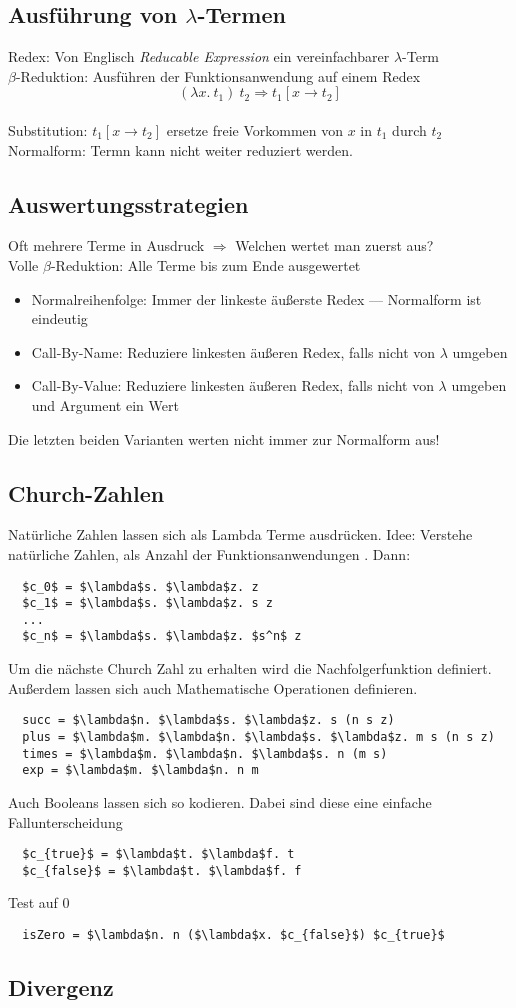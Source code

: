 \subsection{Ausführung von \(\lambda\)-Termen}
Redex: Von Englisch \textit{Reducable Expression} ein vereinfachbarer \(\lambda\)-Term\\
\(\beta\)-Reduktion: Ausführen der Funktionsanwendung auf einem Redex \[(\lambda x.\ t_1)\ t_2 \Rightarrow t_1 [x \rightarrow t_2]\]\\
Substitution: \(t_1 [x \rightarrow t_2]\) ersetze freie Vorkommen von \(x\) in \(t_1\) durch \(t_2\)\\
Normalform: Termn kann nicht weiter reduziert werden.

\subsection{Auswertungsstrategien}
Oft mehrere Terme in Ausdruck \(\Rightarrow\) Welchen wertet man zuerst aus?\\
Volle \(\beta\)-Reduktion: Alle Terme bis zum Ende ausgewertet
\begin{itemize}
  \item Normalreihenfolge: Immer der linkeste äußerste Redex --- Normalform ist eindeutig
  \item Call-By-Name: Reduziere linkesten äußeren Redex, falls nicht von \(\lambda\) umgeben
  \item Call-By-Value: Reduziere linkesten äußeren Redex, falls nicht von \(\lambda\) umgeben und Argument ein Wert
\end{itemize}
Die letzten beiden Varianten werten nicht immer zur Normalform aus!

\subsection{Church-Zahlen}
Natürliche Zahlen lassen sich als Lambda Terme ausdrücken.
Idee: Verstehe natürliche Zahlen, als Anzahl der Funktionsanwendungen . Dann:
\begin{lstlisting}
  $c_0$ = $\lambda$s. $\lambda$z. z
  $c_1$ = $\lambda$s. $\lambda$z. s z
  ...
  $c_n$ = $\lambda$s. $\lambda$z. $s^n$ z

\end{lstlisting}
Um die nächste Church Zahl zu erhalten wird die Nachfolgerfunktion  definiert.
Außerdem lassen sich auch Mathematische Operationen definieren.
\begin{lstlisting}
  succ = $\lambda$n. $\lambda$s. $\lambda$z. s (n s z)
  plus = $\lambda$m. $\lambda$n. $\lambda$s. $\lambda$z. m s (n s z)
  times = $\lambda$m. $\lambda$n. $\lambda$s. n (m s)
  exp = $\lambda$m. $\lambda$n. n m
\end{lstlisting}
Auch Booleans lassen sich so kodieren. Dabei sind diese eine einfache Fallunterscheidung
\begin{lstlisting}
  $c_{true}$ = $\lambda$t. $\lambda$f. t
  $c_{false}$ = $\lambda$t. $\lambda$f. f
\end{lstlisting}
Test auf 0
\begin{lstlisting}
  isZero = $\lambda$n. n ($\lambda$x. $c_{false}$) $c_{true}$
\end{lstlisting}

\subsection{Divergenz}